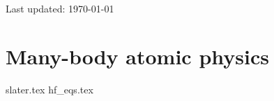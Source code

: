 \documentclass[12pt,a4paper]{article}
\numberwithin{equation}{section}
\begin{document}
Last updated: \today
\tableofcontents
\section{Many-body atomic physics}
{slater.tex}
{hf_eqs.tex}
\end{document}
